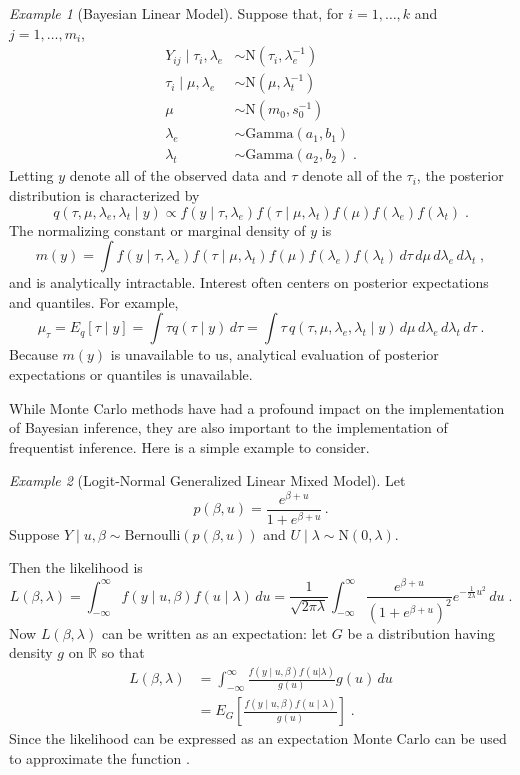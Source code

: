 \documentclass[12pt]{article}
\theoremstyle{plain}
\theoremstyle{definition}
\theoremstyle{remark}
\newtheorem{example}{Example}[section]
\begin{document}
\begin{example}[Bayesian Linear Model]
Suppose that, for $i=1,\ldots,k$ and $j=1,\ldots,m_i$,
\begin{align*}
Y_{ij} \mid \tau_i, \lambda_e & \sim \text{N}(\tau_{i}, \lambda_e^{-1})\\
\tau_{i} \mid  \mu, \lambda_e & \sim \text{N}(\mu, \lambda_t^{-1})\\
\mu &\sim \text{N}(m_0, s_0^{-1}) \\
\lambda_e &\sim \text{Gamma}(a_1,
b_1) \\
\lambda_{t} &\sim \text{Gamma}(a_2, b_2) \; .
\end{align*}
Letting $y$ denote all of the observed data and $\tau$ denote all of the
$\tau_i$, the posterior distribution is characterized by
\[
q(\tau, \mu, \lambda_e, \lambda_t \mid y) \propto f(y\mid\tau,
\lambda_e) f(\tau \mid \mu, \lambda_t) f(\mu) f(\lambda_e) f(\lambda_t)
\; .
\]
The normalizing constant or marginal density of $y$ is
\[
m(y) = \int f(y\mid\tau,
\lambda_e) f(\tau \mid \mu, \lambda_t) f(\mu) f(\lambda_e) f(\lambda_t)\,
d\tau\, d\mu\, d\lambda_e \, d\lambda_t \; ,
\]
and is analytically intractable. Interest often centers on posterior
expectations and quantiles.  For example,
\[
\mu_{\tau}=E_q[\tau \mid y] = \int \tau q(\tau \mid y)\,d\tau = \int \tau \, q(\tau, \mu, \lambda_e,
\lambda_t \mid y) \, d\mu \, d\lambda_e \, d\lambda_t \, d\tau \; .
\]
Because $m(y)$ is unavailable to us, analytical evaluation of
posterior expectations or quantiles is unavailable.
\end{example} 

While Monte Carlo methods have had a profound impact on the
implementation of Bayesian inference, they are also important to
the implementation of frequentist inference.  Here is a simple example
to consider.

\begin{example}[Logit-Normal Generalized Linear Mixed Model]
Let
\[
p(\beta, u) = \frac{e^{\beta + u}}{1 + e^{\beta + u}}\, .
\]
Suppose $Y \mid u, \beta \sim \text{Bernoulli}(p(\beta, u))$ and $U
\mid \lambda
\sim \text{N}(0, \lambda)$.

Then the likelihood is
$$
L(\beta, \lambda)  = \int_{-\infty}^{\infty} f(y\mid u, \beta) f(u \mid \lambda) \, du 
 =\frac{1}{\sqrt{2 \pi \lambda}} \int_{-\infty}^{\infty}
\frac{e^{\beta + u}}{(1 + e^{\beta + u})^2} e^{- \frac{1}{2\lambda}
  u^2}\, du \; .
$$
Now $L(\beta, \lambda)$ can be written as an expectation: let $G$ be
a distribution having density $g$ on $\mathbb{R}$ so that
\[
\begin{split}
L(\beta, \lambda) & = \int_{-\infty}^{\infty} \frac{f(y\mid u, \beta) f(u
  | \lambda)}{g(u)} g(u) \, du \\
& = E_{G}\left[  \frac{f(y \mid u, \beta) f(u \mid \lambda)}{g(u)} \right] \; .
\end{split}
\]
Since the likelihood can be expressed as an expectation Monte Carlo
can be used to approximate the function \cite{geye:1994}.

\end{example}
\end{document}
